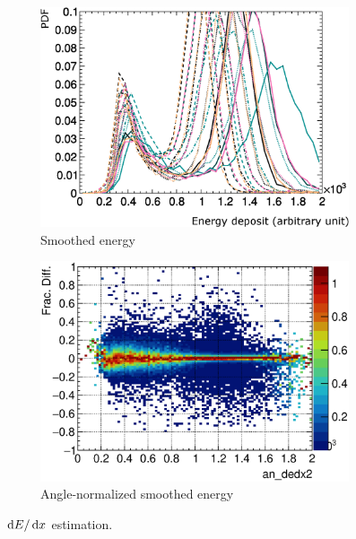   \begin{figure}
        \centering
        \begin{subfigure}[b]{\dbfigwid\textwidth}
             \centering
             \includegraphics[width=\textwidth]{figures/sel/dedx5_pdf_skew_smooth_labelled.eps}
             \caption{Smoothed energy}
             \label{subfig:esc-smooth-e}
        \end{subfigure}
        \begin{subfigure}[b]{\dbfigwid\textwidth}
             \centering
             \includegraphics[width=\textwidth]{figures/sel/ans_dedx2_colnor_vs_p_pr_res_hist2d_al2_selpr_con.eps}
             \caption{Angle-normalized smoothed energy}
             \label{subfig:esc-an-smooth-e}
        \end{subfigure}
        \caption{$\,\textrm{d}E/\,\textrm{d}x$ estimation.}
        \label{fig:esc-angnorm}
  \end{figure}

